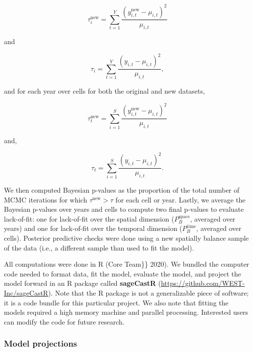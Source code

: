 \documentclass[
  12pt,
]{article}
\begin{document}
\begin{equation}
\tau^{\text{new}}_i = \sum^Y_{t=1} \frac{\left(y^{\text{new}}_{i,t} - \mu_{i,t}\right)^2}{\mu_{i,t}}    
\end{equation}

\noindent{}and

\begin{equation}
\tau_i = \sum^Y_{t=1} \frac{\left(y_{i,t} - \mu_{i,t}\right)^2}{\mu_{i,t}},    
\end{equation}

\noindent{}and for each year over cells for both the original and new datasets,

\begin{equation}
\tau^{\text{new}}_t = \sum^S_{i=1} \frac{\left(y^{\text{new}}_{i,t} - \mu_{i,t}\right)^2}{\mu_{i,t}}    
\end{equation}

\noindent{}and,

\begin{equation}
\tau_t = \sum^S_{i=1} \frac{\left(y_{i,t} - \mu_{i,t}\right)^2}{\mu_{i,t}}.    
\end{equation}

\noindent{}We then computed Bayesian p-values as the proportion of the total number of MCMC iterations for which \(\tau^{\text{new}} > \tau\) for each cell or year.
Lastly, we average the Bayesian p-values over years and cells to compute two final p-values to evaluate lack-of-fit: one for lack-of-fit over the spatial dimension (\(P_B^{\text{space}}\), averaged over years) and one for lack-of-fit over the temporal dimension (\(P_B^{\text{time}}\), averaged over cells).
Posterior predictive checks were done using a new spatially balance sample of the data (i.e., a different sample than used to fit the model).

All computations were done in R (Core Team\}\} 2020).
We bundled the computer code needed to format data, fit the model, evaluate the model, and project the model forward in an R package called \textbf{sageCastR} (\url{https://github.com/WEST-Inc/sageCastR}).
Note that the R package is not a generalizable piece of software; it is a code bundle for this particular project.
We also note that fitting the models required a high memory machine and parallel processing.
Interested users can modify the code for future research.

\hypertarget{model-projections}{%
\subsubsection{Model projections}\label{model-projections}}
\end{document}
